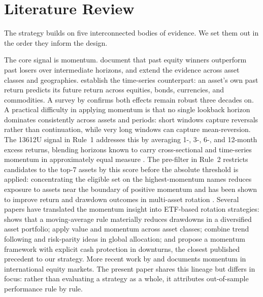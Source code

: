\section{Literature Review}
\label{sec:literature}

The strategy builds on five interconnected bodies of evidence. We set them out in the order they inform the design.

The core signal is momentum. \citet{jegadeesh1993} document that past equity winners outperform past losers over intermediate horizons, and \citet{asness2013} extend the evidence across asset classes and geographies. \citet{moskowitz2012} establish the time-series counterpart: an asset's own past return predicts its future return across equities, bonds, currencies, and commodities. A survey by \citet{jegadeesh2023} confirms both effects remain robust three decades on. A practical difficulty in applying momentum is that no single lookback horizon dominates consistently across assets and periods: short windows capture reversals rather than continuation, while very long windows can capture mean-reversion. The 13612U signal in Rule~1 addresses this by averaging 1-, 3-, 6-, and 12-month excess returns, blending horizons known to carry cross-sectional and time-series momentum in approximately equal measure \citep{moskowitz2012, keller2017}. The pre-filter in Rule~2 restricts candidates to the top-$7$ assets by this score before the absolute threshold is applied: concentrating the eligible set on the highest-momentum names reduces exposure to assets near the boundary of positive momentum and has been shown to improve return and drawdown outcomes in multi-asset rotation \citep{faber2007, keller2017}. Several papers have translated the momentum insight into ETF-based rotation strategies: \citet{faber2007} shows that a moving-average rule materially reduces drawdowns in a diversified asset portfolio; \citet{blitz2008} apply value and momentum across asset classes; \citet{clare2016} combine trend following and risk-parity ideas in global allocation; and \citet{bellu2020} propose a momentum framework with explicit cash protection in downturns, the closest published precedent to our strategy. More recent work by \citet{wouassom2022} and \citet{vukovic2023} documents momentum in international equity markets. The present paper shares this lineage but differs in focus: rather than evaluating a strategy as a whole, it attributes out-of-sample performance rule by rule.

